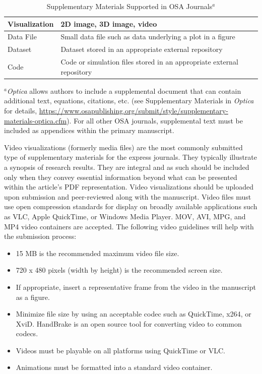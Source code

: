 \documentclass[10pt,letterpaper]{article}
\begin{document}
\begin{table}[h]
\centering
\begin{threeparttable}
\caption{Supplementary Materials Supported in OSA Journals$^a$}
\begin{tabular}{|l|l|}
\hline
Visualization & 2D image, 3D image, video \\ \hline
Data File     & Small data file such as data underlying a plot in a figure \\ \hline
Dataset       & Dataset stored in an appropriate external repository \\ \hline
Code          & Code or simulation files stored in an appropriate external repository \\
\hline
\end{tabular}
\begin{tablenotes}
\item [] $^a$\textit{Optica} allows authors to include a supplemental document that can contain additional text, equations, citations, etc. (see Supplementary Materials in \textit{Optica} for details, \url{https://www.osapublishing.org/submit/style/supplementary-materials-optica.cfm}). For all other OSA journals, supplemental text must be included as appendices within the primary manuscript.
\end{tablenotes}
\end{threeparttable}
\end{table}

Video visualizations (formerly media files) are the most commonly submitted type of supplementary materials for the express journals. They typically illustrate a synopsis of research results. They are integral and as such should be included only when they convey essential information beyond what can be presented within the article's PDF representation. Video visualizations should be uploaded upon submission and peer-reviewed along with the manuscript. Video files must use open compression standards for display on broadly available applications such as VLC, Apple QuickTime, or Windows Media Player. MOV, AVI, MPG, and MP4 video containers are accepted. The following video guidelines will help with the submission process:

\begin{itemize}
\item 15 MB is the recommended maximum video file size.
\item 720 x 480 pixels (width by height) is the recommended screen size.
\item If appropriate, insert a representative frame from the video in the manuscript as a figure.
\item Minimize file size by using an acceptable codec such as QuickTime, x264, or XviD. HandBrake is an open source tool for converting video to common codecs.
\item Videos must be playable on all platforms using QuickTime or VLC.
\item Animations must be formatted into a standard video container.
\end{itemize}
\end{document}
